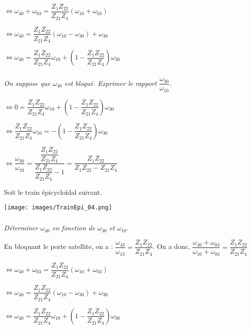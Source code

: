 \documentclass[10pt,fleqn]{article} %
\begin{document}
\begin{multicols}{2}
\begin{multicols}{2}
\begin{corrige}
  $\Leftrightarrow \omega_{40}+\omega_{03}=\dfrac{Z_{1}Z_{22}}{Z_{21}Z_{4}}\left( \omega_{10}+\omega_{03} \right)$
 
 $\Leftrightarrow \omega_{40}=\dfrac{Z_{1}Z_{22}}{Z_{21}Z_{4}}\left( \omega_{10}-\omega_{30} \right) + \omega_{30}$

 $\Leftrightarrow \omega_{40}=\dfrac{Z_{1}Z_{22}}{Z_{21}Z_{4}}\omega_{10} +\left(1- \dfrac{Z_{1}Z_{22}}{Z_{21}Z_{4}}\right)\omega_{30}$

 \end{corrige}
 \else
 \fi
 
\subparagraph{}
\textit{On suppose que $\omega_{40}$ est bloqué. Exprimer le rapport $\dfrac{\omega_{30}}{\omega_{10}}$.}
\ifprof
 \begin{corrige}
 $\Leftrightarrow 0=\dfrac{Z_{1}Z_{22}}{Z_{21}Z_{4}}\omega_{10} +\left(1- \dfrac{Z_{1}Z_{22}}{Z_{21}Z_{4}}\right)\omega_{30}$

$\Leftrightarrow  \dfrac{Z_{1}Z_{22}}{Z_{21}Z_{4}}\omega_{10} =-\left(1- \dfrac{Z_{1}Z_{22}}{Z_{21}Z_{4}}\right)\omega_{30}$

$\Leftrightarrow  \dfrac{\omega_{30}}{\omega_{10}} = \dfrac{ \dfrac{Z_{1}Z_{22}}{Z_{21}Z_{4}}}{ \dfrac{Z_{1}Z_{22}}{Z_{21}Z_{4}}-1}= \dfrac{ {Z_{1}Z_{22}}}{ {Z_{1}Z_{22}}-Z_{21}Z_{4}}$
 \end{corrige}
 \else
 \fi


\ifprof
\else
Soit le train épicycloïdal suivant. 

\begin{center}
 \texttt{[image: images/TrainEpi\_04.png]}
\end{center}
\fi

\ifprof
\newpage
\else
\fi

\subparagraph{}
\textit{Déterminer $\omega_{40}$ en fonction de  $\omega_{30}$ et $\omega_{10}$.}
\ifprof
 \begin{corrige}
 
 En bloquant le porte satellite, on a : $\dfrac{\omega_{43}}{\omega_{13}}=\dfrac{Z_{1}Z_{22}}{Z_{21}Z_{4}}$.
  On a donc, 
  $\dfrac{\omega_{40}+\omega_{03}}{\omega_{10}+\omega_{03}}=
\dfrac{Z_{1}Z_{22}}{Z_{21}Z_{4}}$

  $\Leftrightarrow \omega_{40}+\omega_{03}=\dfrac{Z_{1}Z_{22}}{Z_{21}Z_{4}}\left( \omega_{10}+\omega_{03} \right)$
 
 $\Leftrightarrow \omega_{40}=\dfrac{Z_{1}Z_{22}}{Z_{21}Z_{4}}\left( \omega_{10}-\omega_{30} \right) + \omega_{30}$

 $\Leftrightarrow \omega_{40}=\dfrac{Z_{1}Z_{22}}{Z_{21}Z_{4}}\omega_{10} +\left(1- \dfrac{Z_{1}Z_{22}}{Z_{21}Z_{4}}\right)\omega_{30}$


\end{corrige}
\end{multicols}
\end{multicols}
\end{document}
